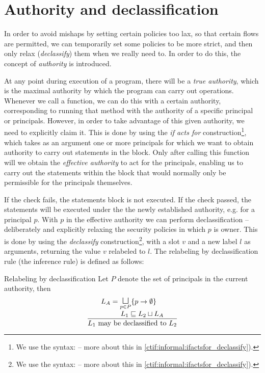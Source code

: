 \section{Authority and declassification}\label{dlm:auth_and_declass}
In order to avoid mishaps by setting certain policies too lax, so that certain flows are permitted, we can temporarily set some policies to be more strict, and then only relax (\emph{declassify}) them when we really need to.
In order to do this, the concept of \emph{authority} is introduced.

At any point during execution of a program, there will be a \emph{true authority}, which is the maximal authority by which the program can carry out operations.
Whenever we call a function, we can do this with a certain authority, corresponding to running that method with the authority of a specific principal or principals.
However, in order to take advantage of this given authority, we need to explicitly claim it.
This is done by using the \emph{if acts for} construction\footnote{We use the syntax:  -- more about this in \cref{ctif:informal:ifactsfor_declassify}).}, which takes as an argument one or more principals for which we want to obtain authority to carry out statements in the block.
Only after calling this function will we obtain the \emph{effective authority} to act for the principals, enabling us to carry out the statements within the  block that would normally only be permissible for the principals themselves.

If the check fails, the statements block is not executed.
If the check passed, the statements will be executed under the the newly established authority, e.g. for a principal $p$.
With $p$ in the effective authority we can perform declassification -- deliberately and explicitly relaxing the security policies in which $p$ is owner.
This is done by using the \emph{declassify} construction\footnote{We use the syntax:  -- more about this in \cref{ctif:informal:ifactsfor_declassify}).}, with a slot $v$ and a new label $l$ as arguments, returning the value $v$ relabeled to $l$.
The relabeling by declassification rule (the inference rule) is defined as follows:

\begin{definition}{Relabeling by declassification}
  Let $P$ denote the set of principals in the current authority, then
  \[
  \frac
  {
    \splitfrac
    {
      L_A = \mathlarger\sqcupl_{p \in P} \{p \rightarrow \emptyset \}
    }
    {
      L_1 \sqsubseteq L_2 \sqcup L_A
    }
  }
  {
    L_1 \text{ may be declassified to } L_2
  }
  \]
\end{definition}

